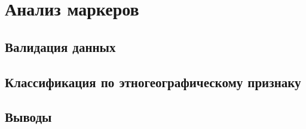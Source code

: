 \chapter{Анализ маркеров}
\section{Валидация данных}
\section{Классификация по этногеографическому признаку}
\section{Выводы}

